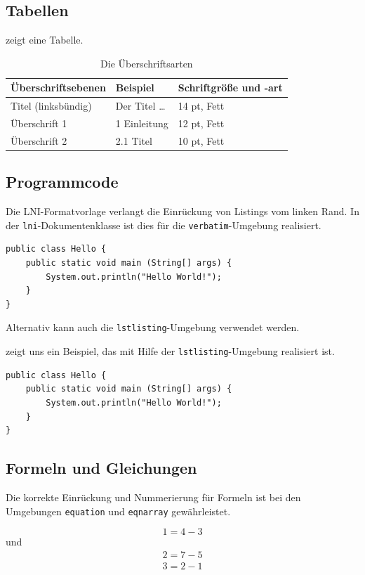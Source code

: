 \documentclass[utf8,biblatex]{lni}
\begin{document}
\subsection{Tabellen}
 zeigt eine Tabelle.

\begin{table}
\centering
\begin{tabular}{lll}
\toprule
Überschriftsebenen & Beispiel & Schriftgröße und -art \\
\midrule
Titel (linksbündig) & Der Titel \ldots & 14 pt, Fett\\
Überschrift 1 & 1 Einleitung & 12 pt, Fett\\
Überschrift 2 & 2.1 Titel & 10 pt, Fett\\
\bottomrule
\end{tabular}
\caption{Die Überschriftsarten}
\label{tab:demo}
\end{table}

\subsection{Programmcode}
Die LNI-Formatvorlage verlangt die Einrückung von Listings vom linken Rand.
In der \texttt{lni}-Dokumentenklasse ist dies für die \texttt{verbatim}-Umgebung realisiert.

\begin{verbatim}
public class Hello {
    public static void main (String[] args) {
        System.out.println("Hello World!");
    }
}
\end{verbatim}

Alternativ kann auch die \texttt{lstlisting}-Umgebung verwendet werden.

 zeigt uns ein Beispiel, das mit Hilfe der \texttt{lstlisting}-Umgebung realisiert ist.

\begin{lstlisting}[caption={Beschreibung}, label=L1]
public class Hello {
    public static void main (String[] args) {
        System.out.println("Hello World!");
    }
}
\end{lstlisting}

\subsection{Formeln und Gleichungen}

Die korrekte Einrückung und Nummerierung für Formeln ist bei den Umgebungen \texttt{equation} und \texttt{eqnarray} gewährleistet.

\begin{equation}
  1=4-3
\end{equation}
und
\begin{eqnarray}
  2=7-5\\
  3=2-1
\end{eqnarray}

\printbibliography
\end{document}
